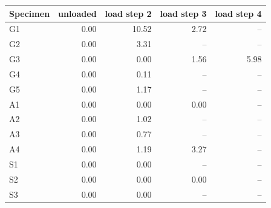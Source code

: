 \begin{tabular}{lrrrr}
\toprule
Specimen & unloaded & load step 2 & load step 3 & load step 4 \\
\midrule
G1 & 0.00 & 10.52 & 2.72 & -- \\
G2 & 0.00 & 3.31 & -- & -- \\
G3 & 0.00 & 0.00 & 1.56 & 5.98 \\
G4 & 0.00 & 0.11 & -- & -- \\
G5 & 0.00 & 1.17 & -- & -- \\
A1 & 0.00 & 0.00 & 0.00 & -- \\
A2 & 0.00 & 1.02 & -- & -- \\
A3 & 0.00 & 0.77 & -- & -- \\
A4 & 0.00 & 1.19 & 3.27 & -- \\
S1 & 0.00 & 0.00 & -- & -- \\
S2 & 0.00 & 0.00 & 0.00 & -- \\
S3 & 0.00 & 0.00 & -- & -- \\
\bottomrule
\end{tabular}
